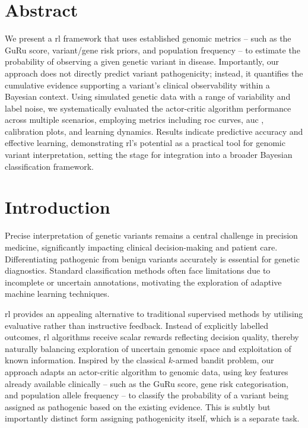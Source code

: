 \section*{Abstract}

We present a \ac{rl} framework that uses established genomic metrics -- such as the GuRu score, variant/gene risk priors, and population frequency -- to estimate the probability of observing a given genetic variant in disease. Importantly, our approach does not directly predict variant pathogenicity; instead, it quantifies the cumulative evidence supporting a variant’s clinical observability within a Bayesian context. Using simulated genetic data with a range of variability and label noise, we systematically evaluated the actor-critic algorithm performance across multiple scenarios, employing metrics including \ac{roc} curves, \ac{auc} , calibration plots, and learning dynamics. Results indicate predictive accuracy and effective learning, demonstrating \ac{rl}’s potential as a practical tool for genomic variant interpretation, setting the stage for integration into a broader Bayesian classification framework.

\section{Introduction}
Precise interpretation of genetic variants remains a central challenge in precision medicine, significantly impacting clinical decision-making and patient care. Differentiating pathogenic from benign variants accurately is essential for genetic diagnostics. Standard classification methods often face limitations due to incomplete or uncertain annotations, motivating the exploration of adaptive machine learning techniques.

\ac{rl} provides an appealing alternative to traditional supervised methods by utilising evaluative rather than instructive feedback. Instead of explicitly labelled outcomes, \ac{rl} algorithms receive scalar rewards reflecting decision quality, thereby naturally balancing exploration of uncertain genomic space and exploitation of known information. Inspired by the classical $k$-armed bandit problem, our approach adapts an actor-critic algorithm to genomic data, using key features already available clinically -- such as the GuRu score, gene risk categorisation, and population allele frequency -- to classify the probability of a variant being assigned as pathogenic based on the existing evidence.
This is subtly but importantly distinct form assigning pathogenicity itself, which is a separate task.

